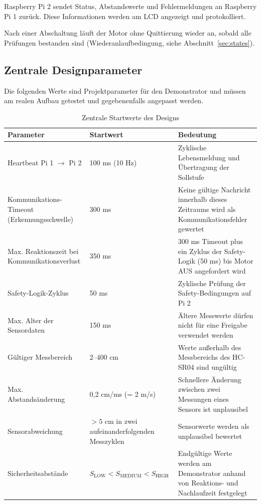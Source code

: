 Raspberry Pi 2 sendet Status, Abstandswerte und Fehlermeldungen an Raspberry Pi
1 zurück. Diese Informationen werden am LCD angezeigt und protokolliert.

Nach einer Abschaltung läuft der Motor ohne Quittierung wieder an, sobald alle
Prüfungen bestanden sind (Wiederanlaufbedingung, siehe
Abschnitt~\ref{sec:states}).

\subsection{Zentrale Designparameter}

Die folgenden Werte sind Projektparameter für den Demonstrator und müssen am
realen Aufbau getestet und gegebenenfalls angepasst werden.

\begin{table}[H]
    \centering
    \begin{tabularx}{\textwidth}{@{}p{5.1cm}p{3.2cm}Y@{}}
        \toprule
        \textbf{Parameter} & \textbf{Startwert} & \textbf{Bedeutung} \\
        \midrule
        Heartbeat Pi 1 $\rightarrow$ Pi 2 & 100 ms (10 Hz) & Zyklische Lebensmeldung und Übertragung der Sollstufe \\
        Kommunikations-Timeout (Erkennungsschwelle) & 300 ms & Keine gültige Nachricht innerhalb dieses Zeitraums wird als Kommunikationsfehler gewertet \\
        Max. Reaktionszeit bei Kommunikationsverlust & 350 ms & 300 ms Timeout plus ein Zyklus der Safety-Logik (50 ms) bis Motor AUS angefordert wird \\
        Safety-Logik-Zyklus & 50 ms & Zyklische Prüfung der Safety-Bedingungen auf Pi 2 \\
        Max. Alter der Sensordaten & 150 ms & Ältere Messwerte dürfen nicht für eine Freigabe verwendet werden \\
        Gültiger Messbereich & 2--400 cm & Werte außerhalb des Messbereichs des HC-SR04 sind ungültig \\
        Max. Abstandsänderung & 0{,}2 cm/ms (= 2 m/s) & Schnellere Änderung zwischen zwei Messungen eines Sensors ist unplausibel \\
        Sensorabweichung & $> 5$ cm in zwei aufeinanderfolgenden Messzyklen & Sensorwerte werden als unplausibel bewertet \\
        Sicherheitsabstände & $S_{\mathrm{LOW}} < S_{\mathrm{MEDIUM}} < S_{\mathrm{HIGH}}$ & Endgültige Werte werden am Demonstrator anhand von Reaktions- und Nachlaufzeit festgelegt \\
        \bottomrule
    \end{tabularx}
    \caption{Zentrale Startwerte des Designs}
\end{table}

